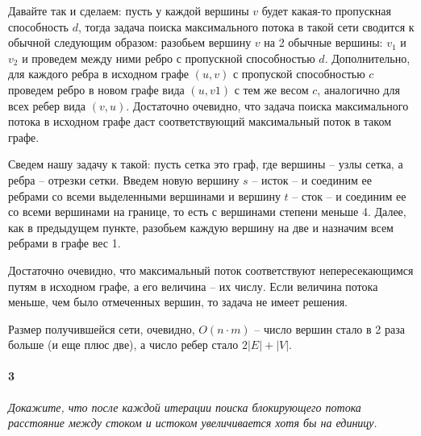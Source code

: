 \documentclass[russian]{article}
\begin{document}
Давайте так и сделаем: пусть у каждой вершины $v$ будет какая-то пропускная способность $d$, тогда задача поиска максимального потока в такой сети сводится к обычной следующим образом: разобьем вершину $v$ на 2 обычные вершины: $v_1$ и $v_2$ и проведем между ними ребро с пропускной способностью $d$. Дополнительно, для каждого ребра в исходном графе $(u, v)$ с пропуской способностью $c$ проведем ребро в новом графе вида $(u, v1)$ с тем же весом $c$, аналогично для всех ребер вида $(v, u)$. Достаточно очевидно, что задача поиска максимального потока в исходном графе даст соответствующий максимальный поток в таком графе.

Сведем нашу задачу к такой: пусть сетка это граф, где вершины -- узлы сетка, а ребра -- отрезки сетки. Введем новую вершину $s$ -- исток -- и соединим ее ребрами со всеми выделенными вершинами и вершину $t$ -- сток -- и соединим ее со всеми вершинами на границе, то есть с вершинами степени меньше 4. Далее, как в предыдущем пункте, разобьем каждую вершину на две и назначим всем ребрами в графе вес 1.

Достаточно очевидно, что максимальный поток соответствуют непересекающимся путям в исходном графе, а его величина -- их числу. Если величина потока меньше, чем было отмеченных вершин, то задача не имеет решения.

Размер получившейся сети, очевидно, $O(n \cdot m)$ -- число вершин стало в 2 раза больше (и еще плюс две), а число ребер стало $2|E| + |V|$.

\paragraph*{3}

\textit{Докажите, что после каждой итерации поиска блокирующего потока расстояние между стоком и истоком увеличивается хотя бы на единицу.}
\end{document}
